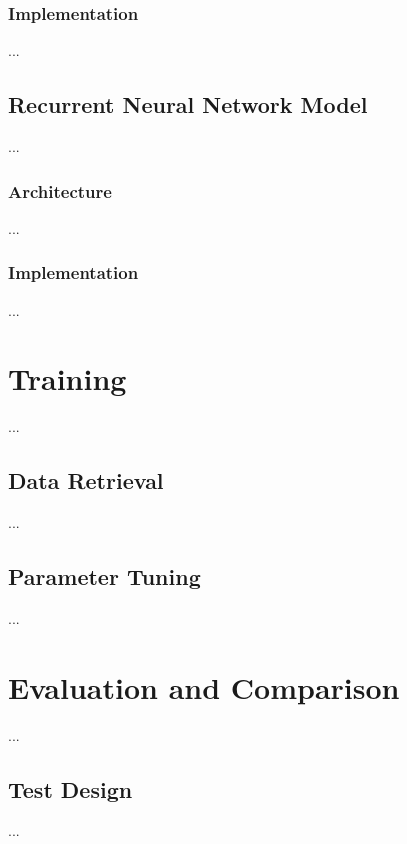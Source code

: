 \subsection{Implementation}\label{c.postagging.fnn.implementation}
...

\section{Recurrent Neural Network Model}\label{c.postagging.rnn}
...

\subsection{Architecture}\label{c.postagging.rnn.architecture}
...

\subsection{Implementation}\label{c.postagging.rnn.implementation}
...

\chapter{Training}\label{c.training}
...

\section{Data Retrieval}\label{c.training.data}
...

\section{Parameter Tuning}\label{c.training.tuning}
...

\chapter{Evaluation and Comparison}\label{c.evaluation}
...

\section{Test Design}\label{c.evaluation.test}
...

